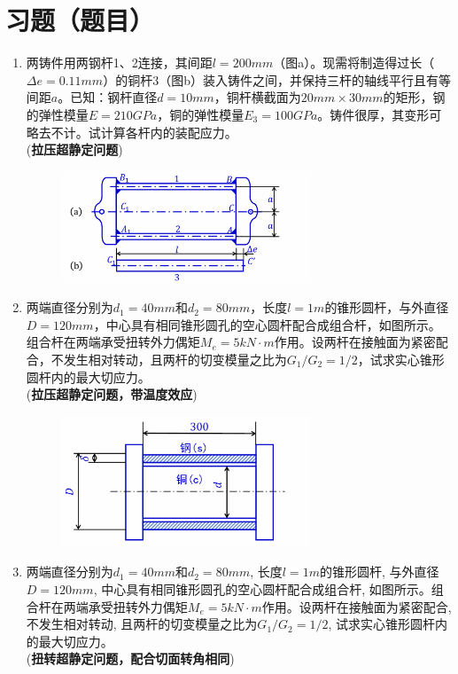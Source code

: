 \documentclass[12pt,a4paper]{article}
\newcounter{question}
\newenvironment{questions}{
    \setcounter{question}{0}
    \section*{习题（题目）}
    \begin{enumerate}[leftmargin=1.5em,label={\arabic*．}]
}{
    \end{enumerate}
}
\begin{document}
\begin{questions}
    \item 两铸件用两钢杆1、2连接，其间距\( l = 200mm \)（图a）。现需将制造得过长（\(\Delta e = 0.11mm\)）的铜杆3（图b）装入铸件之间，并保持三杆的轴线平行且有等间距\( a \)。已知：钢杆直径\( d = 10mm \)，铜杆横截面为\( 20mm \times 30mm \)的矩形，钢的弹性模量\( E = 210GPa \)，铜的弹性模量\( E_3 = 100GPa \)。铸件很厚，其变形可略去不计。试计算各杆内的装配应力。\\(\textbf{拉压超静定问题})
    
    \begin{figure}[H]
        \centering
        \includegraphics[width=0.7\textwidth]{figures/1.png}
    \end{figure}

    \item 两端直径分别为\( d_1 = 40mm \)和\( d_2 = 80mm \)，长度\( l = 1m \)的锥形圆杆，与外直径\( D = 120mm \)，中心具有相同锥形圆孔的空心圆杆配合成组合杆，如图所示。组合杆在两端承受扭转外力偶矩\( M_e = 5kN \cdot m \)作用。设两杆在接触面为紧密配合，不发生相对转动，且两杆的切变模量之比为\( G_1 / G_2 = 1/2 \)，试求实心锥形圆杆内的最大切应力。\\(\textbf{拉压超静定问题，带温度效应})

    \begin{figure}[H]
        \centering
        \includegraphics[width=0.7\textwidth]{figures/2.png}
    \end{figure}

    \item 两端直径分别为\( d_1 = 40mm \)和\( d_2 = 80mm \), 长度\( l = 1m \)的锥形圆杆, 与外直径\( D = 120mm \), 中心具有相同锥形圆孔的空心圆杆配合成组合杆, 如图所示。组合杆在两端承受扭转外力偶矩\( M_e = 5kN \cdot m \)作用。设两杆在接触面为紧密配合, 不发生相对转动, 且两杆的切变模量之比为\( G_1 / G_2 = 1/2 \), 试求实心锥形圆杆内的最大切应力。\\(\textbf{扭转超静定问题，配合切面转角相同})
    

\end{questions}
\end{document}
